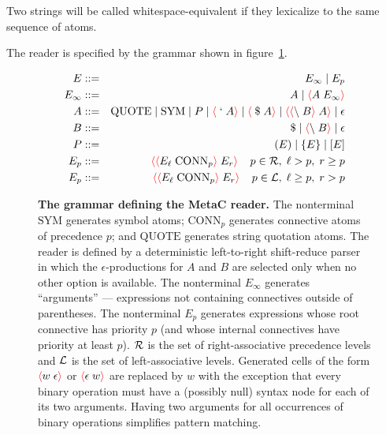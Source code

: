 \documentclass{article}
\newcommand{\fopen}{{\color{red} \langle}}
\newcommand{\fclose}{{\color{red} \rangle}}
\begin{document}
Two strings will be called whitespace-equivalent if they lexicalize to the same sequence of atoms.

\newcommand{\sym}{\mathrm{SYM}}
\newcommand{\conn}{\mathrm{CONN}}
\newcommand{\quot}{\mathrm{QUOTE}}
\newcommand{\misc}{\mathrm{MISC}}
\newcommand{\app}{\mathrm{APP}}
\newcommand{\var}{\mathrm{VAR}}


The reader is specified by the grammar shown in figure~\ref{fig:grammar}.

\begin{figure}
  
\begin{eqnarray*}
  E & ::= & E_\infty \;|\; E_p \\
  E_\infty & ::= & A \;|\; \fopen A \; E_\infty \fclose \\
  A & ::= & \quot \;|\; \sym \;|\; P  \;|\; \fopen \; `\;A\fclose \;|\; \fopen \; \$\;A\fclose \;|\;\fopen\fopen\backslash\; B \fclose\;A \fclose \;|\; \epsilon \\
  B & ::= & \$ \;|\; \fopen \backslash\;B \fclose \;|\; \epsilon \\
  P & ::= & (E) \;|\; \{E\} \;|\; [E] \\
  E_p & ::= & \fopen \fopen  E_\ell\;\conn_p \fclose \;E_r\fclose\;\;\;\;p \in {\cal R}, \;\ell > p, \; r \geq p \\
  E_p & ::= & \fopen \fopen E_\ell\;\conn_p \fclose \;E_r\fclose\;\;\;\;p \in {\cal L}, \; \ell \geq p,\; r > p
\end{eqnarray*}

\caption{{\bf The grammar defining the MetaC reader.}
The nonterminal $\sym$ generates symbol atoms; $\conn_p$ generates connective atoms of precedence $p$; and $\quot$ generates string quotation atoms.
The reader is defined by a deterministic left-to-right shift-reduce parser
in which the $\epsilon$-productions for $A$ and $B$ are selected only when no other option is available.
The nonterminal $E_\infty$ generates ``arguments'' --- expressions not containing connectives outside of parentheses.
The nonterminal $E_p$ generates expressions whose root connective has priority $p$ (and whose internal connectives have priority at least $p$).
${\cal R}$ is the set of right-associative precedence levels and ${\cal L}$ is the set of left-associative levels.
Generated cells of the form $\fopen w\;\epsilon \fclose$ or $\fopen \epsilon \;w\fclose$ are replaced by $w$
with the exception that every binary operation must have a (possibly null) syntax node for each of its two arguments.
Having two arguments for all occurrences of binary operations simplifies pattern matching.
}
\label{fig:grammar}
\end{figure}
\end{document}
